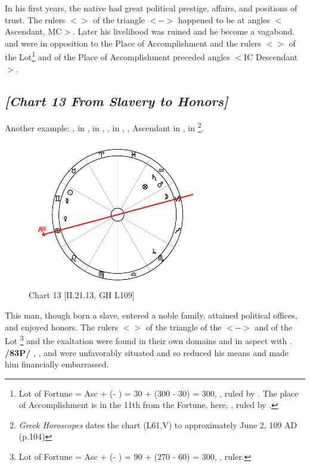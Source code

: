 In his first years, the native had great political prestige, affairs, and positions of trust. The rulers $<$\Venus\xspace \Moon$>$ of the triangle $<$\Taurus-\Virgo-\Capricorn$>$ happened to be at angles $<$Ascendant, MC$>$. Later his livelihood was ruined and he become a vagabond. \Mars\xspace and \Mercury\xspace were in opposition to the Place of Accomplishment and the rulers $<$\Saturn\xspace \Jupiter$>$ of the Lot\footnote{Lot of Fortune = Asc + (\Moon\xspace\xspace - \Sun) = 30 + (300 - 30) = 300, \Aquarius, ruled by \Saturn. The place of Accomplishment is in the 11th from the Fortune, here, \Sagittarius, ruled by \Jupiter.}
 and of the Place of Accomplishment preceded angles $<$IC Descendant$>$.
 
\newpage
\subsection*{\textit{[Chart 13 From Slavery to Honors]}}

Another example: \Sun, \Mercury\xspace in \Gemini,\Moon\xspace in \Capricorn, \Saturn, \Mars\xspace in \Aquarius, \Venus, Ascendant in \Cancer, \Jupiter\xspace in \Scorpio
\footnote{\textit{Greek Horoscopes} dates the chart (L61,V) to approximately June 2, 109 AD (p.104)}.

\clearpage
\begin{figure}
\centering
\vspace{-20pt}
\includegraphics[width=0.68\textwidth]{charts/2_21_13}
\caption{Chart 13 [II.21.13, GH L109]}
\label{fig:chart13}
\end{figure}

This man, though born a slave, entered a noble family, attained political offices, and enjoyed honors. The rulers $<$\Saturn\xspace \Mercury$>$ of the triangle of the \Sun\xspace $<$\Gemini-\Libra-\Aquarius$>$ and of the Lot
\footnote{Lot of Fortune = Asc + (\Moon\xspace\xspace - \Sun) = 90 + (270 - 60) = 300, \Aquarius, \Saturn\xspace ruler.}
 and the exaltation were found in their own domains and in aspect with
\Jupiter. \textbf{/83P/} \Mars, \Saturn, and \Mercury\xspace were unfavorably situated and so reduced his means and made
him financially embarrassed.

